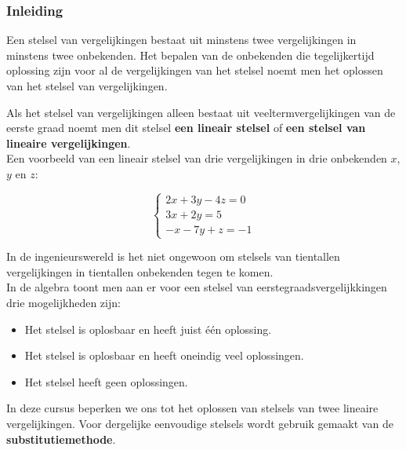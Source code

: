 \subsubsection{Inleiding}

\begin{definitie}
	Een stelsel van vergelijkingen bestaat uit minstens twee vergelijkingen in minstens twee onbekenden. Het bepalen van de onbekenden die tegelijkertijd oplossing zijn voor al de vergelijkingen van het stelsel noemt men het oplossen van het stelsel van vergelijkingen.
\end{definitie}

Als het stelsel van vergelijkingen alleen bestaat uit veeltermvergelijkingen van de eerste graad noemt men dit stelsel {\bf een lineair stelsel} of {\bf een stelsel van lineaire vergelijkingen}.\\ Een voorbeeld van een lineair stelsel van drie vergelijkingen in drie onbekenden $x$, $y$ en $z$:

\[\left\{ {
\begin{array}{l}
2x + 3y - 4z = 0\\
3x + 2y =  5\\
-x - 7y + z = -1
\end{array}} \right.\]

In de ingenieurswereld is het niet ongewoon om stelsels van tientallen vergelijkingen in tientallen onbekenden tegen te komen.\\


In de algebra toont men aan er voor een stelsel van eerstegraadsvergelijkkingen drie mogelijkheden zijn:
\begin{itemize}
\item Het stelsel is oplosbaar en heeft juist \'{e}\'{e}n oplossing.
\item Het stelsel is oplosbaar en heeft oneindig veel oplossingen.
\item Het stelsel heeft geen oplossingen.
\end{itemize}

In deze cursus beperken we ons tot het oplossen van stelsels van twee lineaire vergelijkingen. Voor dergelijke eenvoudige stelsels wordt gebruik gemaakt van de {\bf substitutiemethode}. \\


